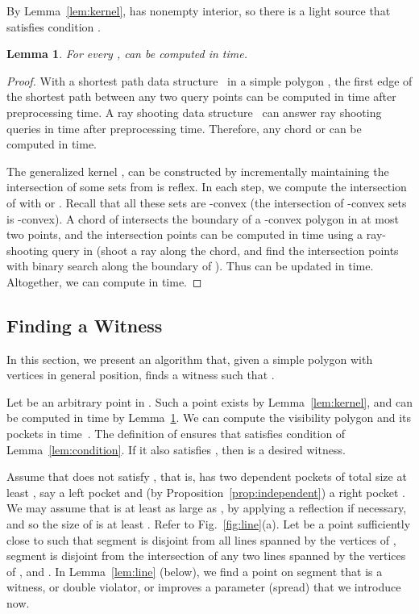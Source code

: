 \documentclass[12pt]{article}
\newtheorem{lemma}{Lemma}
\begin{document}
By Lemma~\ref{lem:kernel},  has nonempty interior,
so there is a light source  
that satisfies condition .

\begin{lemma}\label{lem:kernel2}
For every ,  can be computed in  time.
\end{lemma}

\begin{proof}
With a shortest path data structure~\cite{GH89} in a simple polygon , the first edge of the shortest path
between any two query points can be computed in  time after  preprocessing time. A ray shooting data structure~\cite{HS95} can answer ray shooting queries in  time after  preprocessing time. Therefore, any chord  or  can be computed in  time.

The generalized kernel , can be constructed by incrementally maintaining the intersection  of some sets from  is reflex. In each step, we compute the intersection of  with  or . Recall that all these sets are -convex (the intersection of -convex sets is -convex). A chord of  intersects the boundary of a -convex polygon  in at most two points, and the intersection points can be computed in  time using a ray-shooting query in  (shoot a ray along the chord, and find the intersection points with binary search along the boundary of ). Thus  can be updated in  time. Altogether, we can compute  in  time.
\end{proof}


\subsection{Finding a Witness}
\label{ssec:witness}

In this section, we present an algorithm that, given a simple polygon  with  vertices in general position, finds a witness  such that .

Let  be an arbitrary point in . Such a point exists by Lemma~\ref{lem:kernel}, and can be computed in  time by Lemma~\ref{lem:kernel2}. We can compute the visibility polygon 
and its pockets in  time~\cite{GHL+87}. The definition of  ensures that  satisfies condition  of Lemma~\ref{lem:condition}. If it also satisfies , then  is a desired witness.

Assume that  does not satisfy , that is,  has two dependent pockets of total size at least , say a left pocket  and (by Proposition~\ref{prop:independent}) a right pocket . We may assume that  is at least as large as , by applying a reflection if necessary, and so the size of  is at least . Refer to Fig.~\ref{fig:line}(a). Let  be a point sufficiently close to  such that segment  is disjoint from all lines spanned by the vertices of , segment  is disjoint from the intersection of any two lines spanned by the vertices of , and . In Lemma~\ref{lem:line} (below), we find a point on segment  that is a witness, or double violator, or improves a parameter (spread) that we introduce now.
\end{document}
